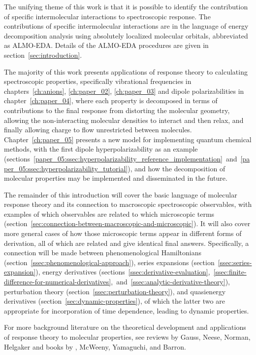 \documentclass[%
class = book,%
crop = false,%
float = true,%
multi = true,%
preview = false,%
]{standalone}
\begin{document}
The unifying theme of this work is that it is possible to identify the contribution of specific intermolecular interactions to spectroscopic response. The contributions of specific intermolecular interactions are in the language of energy decomposition analysis using absolutely localized molecular orbitals, abbreviated as ALMO-EDA. Details of the ALMO-EDA procedures are given in section~\ref{sec:introduction}.

The majority of this work presents applications of response theory to calculating spectroscopic properties, specifically vibrational frequencies in chapters~\ref{ch:anions}, \ref{ch:paper_02}, \ref{ch:paper_03} and dipole polarizabilities in chapter~\ref{ch:paper_04}, where each property is decomposed in terms of contributions to the final response from distorting the molecular geometry, allowing the non-interacting molecular densities to interact and then relax, and finally allowing charge to flow unrestricted between molecules. Chapter~\ref{ch:paper_05} presents a new model for implementing quantum chemical methods, with the first dipole hyperpolarizability as an example (sections~\ref{paper_05:ssec:hyperpolarizability_reference_implementation}~and~\ref{paper_05:ssec:hyperpolarizability_tutorial}), and how the decomposition of molecular properties may be implemented and disseminated in the future.

The remainder of this introduction will cover the basic language of molecular response theory and its connection to macroscopic spectroscopic observables, with examples of which observables are related to which microscopic terms (section~\ref{sec:connection-between-macroscopic-and-microscopic}). It will also cover more general cases of how those microscopic terms appear in different forms of derivation, all of which are related and give identical final answers. Specifically, a connection will be made between phenomenological Hamiltonians (section~\ref{ssec:phenomenological-approach}), series expansions (section~\ref{ssec:series-expansion}), energy derivatives (sections~\ref{ssec:derivative-evaluation},~\ref{ssec:finite-difference-for-numerical-derivatives},~and~\ref{ssec:analytic-derivative-theory}), perturbation theory (section~\ref{ssec:perturbation-theory}), and quasienergy derivatives (section~\ref{sec:dynamic-properties}), of which the latter two are appropriate for incorporation of time dependence, leading to dynamic properties.

For more background literature on the theoretical development and applications of response theory to molecular properties, see reviews by Gauss\cite{gauss2000}, Neese\cite{NEESE2009526}, Norman\cite{C1CP21951K}, Helgaker\cite{doi:10.1021/cr2002239} and books by \szabo{}\cite{szabo1989modern}, McWeeny\cite{mcweeny1989methods}, Yamaguchi\cite{Yamaguchi1994}, and Barron\cite{barron2004molecular}.
\end{document}
